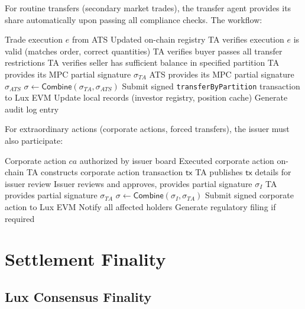 \documentclass[11pt,a4paper]{article}
\begin{document}
For routine transfers (secondary market trades), the transfer agent provides its share automatically upon passing all compliance checks. The workflow:

\begin{algorithm}[H]
\caption{Transfer agent registry update.}
\label{alg:registry-update}
\begin{algorithmic}[1]
\Require Trade execution $e$ from ATS \cite{lux-ats-architecture}
\Ensure Updated on-chain registry
\State TA verifies execution $e$ is valid (matches order, correct quantities)
\State TA verifies buyer passes all transfer restrictions \cite{lux-security-token-standard}
\State TA verifies seller has sufficient balance in specified partition
\State TA provides its MPC partial signature $\sigma_{TA}$
\State ATS provides its MPC partial signature $\sigma_{ATS}$
\State $\sigma \gets \textsf{Combine}(\sigma_{TA}, \sigma_{ATS})$
\State Submit signed \texttt{transferByPartition} transaction to Lux EVM
\State Update local records (investor registry, position cache)
\State Generate audit log entry
\end{algorithmic}
\end{algorithm}

For extraordinary actions (corporate actions, forced transfers), the issuer must also participate:

\begin{algorithm}[H]
\caption{Corporate action execution.}
\label{alg:corporate-action}
\begin{algorithmic}[1]
\Require Corporate action $ca$ authorized by issuer board
\Ensure Executed corporate action on-chain
\State TA constructs corporate action transaction $\textsf{tx}$
\State TA publishes $\textsf{tx}$ details for issuer review
\State Issuer reviews and approves, provides partial signature $\sigma_I$
\State TA provides partial signature $\sigma_{TA}$
\State $\sigma \gets \textsf{Combine}(\sigma_I, \sigma_{TA})$
\State Submit signed corporate action to Lux EVM
\State Notify all affected holders
\State Generate regulatory filing if required
\end{algorithmic}
\end{algorithm}

\section{Settlement Finality}\label{sec:settlement}

\subsection{Lux Consensus Finality}
\end{document}
